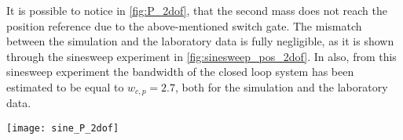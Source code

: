It is possible to notice in \cref{fig:P_2dof}, that the second mass does not reach the position reference due to the above-mentioned switch gate.
The mismatch between the simulation and the laboratory data is fully negligible, as it is shown through the sinesweep experiment in \cref{fig:sinesweep_pos_2dof}. In also, from this sinesweep experiment the bandwidth of the closed loop system has been estimated to be equal to $w_{c,p}=2.7$, both for the simulation and the laboratory data.
\begin{figure*}[h]
	\centering
	\texttt{[image: sine\_P\_2dof]}
	\caption{Sineweep experiment from $0.1\ Hz$ to $1\ Hz$ in $100\ s$}
	\label{fig:sinesweep_pos_2dof}
\end{figure*}